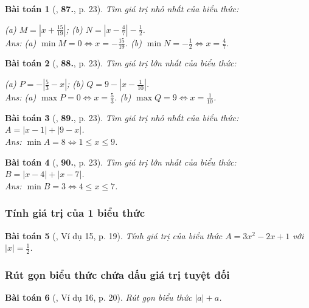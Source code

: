 \documentclass{article}
\newtheorem{baitoan}{Bài toán}
\begin{document}
\begin{baitoan}[\cite{Tuyen_Toan_7}, \textbf{87.}, p. 23]
	Tìm giá trị nhỏ nhất của biểu thức:
	
		(a) $M = \left|x + \frac{15}{19}\right|$;
		(b) $N = \left|x - \frac{4}{7}\right| - \frac{1}{2}$.
	\\\mbox{}\hfill{\sf Ans:} (a) $\min M = 0\Leftrightarrow x = -\frac{15}{19}$. (b) $\min N = -\frac{1}{2}\Leftrightarrow x = \frac{4}{7}$.
\end{baitoan}

\begin{baitoan}[\cite{Tuyen_Toan_7}, \textbf{88.}, p. 23]
	Tìm giá trị lớn nhất của biểu thức:
	
		(a) $P = -\left|\frac{5}{3} - x\right|$;
		(b) $Q = 9 - \left|x - \frac{1}{10}\right|$.
	\\\mbox{}\hfill{\sf Ans:} (a) $\max P = 0\Leftrightarrow x = \frac{5}{3}$. (b) $\max Q = 9\Leftrightarrow x = \frac{1}{10}$.
\end{baitoan}

\begin{baitoan}[\cite{Tuyen_Toan_7}, \textbf{89.}, p. 23]
	Tìm giá trị nhỏ nhất của biểu thức: $A = |x - 1| + |9 - x|$.\\\mbox{}\hfill{\sf Ans:} $\min A = 8\Leftrightarrow 1\le x\le 9$.
\end{baitoan}

\begin{baitoan}[\cite{Tuyen_Toan_7}, \textbf{90.}, p. 23]
	Tìm giá trị lớn nhất của biểu thức: $B = |x - 4| + |x - 7|$.\\\mbox{}\hfill{\sf Ans:} $\min B = 3\Leftrightarrow 4\le x\le 7$.
\end{baitoan}

\subsubsection{Tính giá trị của 1 biểu thức}

\begin{baitoan}[\cite{Binh_Toan_7_tap_1}, Ví dụ 15, p. 19]
	Tính giá trị của biểu thức $A = 3x^2 - 2x + 1$ với $|x| = \frac{1}{2}$.
\end{baitoan}

\subsubsection{Rút gọn biểu thức chứa dấu giá trị tuyệt đối}

\begin{baitoan}[\cite{Binh_Toan_7_tap_1}, Ví dụ 16, p. 20]
	Rút gọn biểu thức $|a| + a$.
\end{baitoan}
\end{document}
